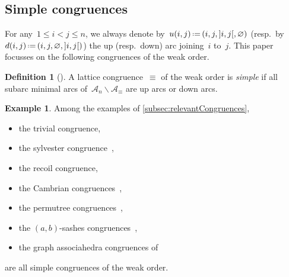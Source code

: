 \documentclass{amsart}
\theoremstyle{definition}
\newtheorem{definition}[theorem]{Definition}
\newtheorem{example}[theorem]{Example}
\newtheorem{remark}[theorem]{Remark}
\newcommand{\ssm}{\smallsetminus} %
\newcommand{\eqdef}{\mbox{\,\raisebox{0.2ex}{\scriptsize\ensuremath{\mathrm:}}\ensuremath{=}\,}} %
\newcommand{\darkblue}{\color{darkblue}} %
\newcommand{\defn}[1]{\textsl{\darkblue #1}} %
\newcommand{\arc}{\alpha} %
\newcommand{\arcs}{{\mathcal{A}}} %
\begin{document}

\subsection{Simple congruences}
\label{subsec:simpleCongruences}

For any~$1 \le i < j \le n$, we always denote by~$u(i,j) \eqdef (i, j, {]i,j[}, \varnothing)$ (resp.~by~$d(i,j) \eqdef (i, j, \varnothing, {]i,j[})$) the up (resp.~down) arc joining~$i$ to~$j$.
This paper focusses on the following congruences of the weak order.

\begin{definition}[{\cite[Sect.~4.4]{HoangMutze}}]
\label{def:simpleCongruence}
A lattice congruence~$\equiv$ of the weak order is \defn{simple} if all subarc minimal arcs of~$\arcs_n \ssm \arcs_\equiv$ are up arcs or down arcs.
\end{definition}


\begin{example}
Among the examples of \cref{subsec:relevantCongruences},
\begin{itemize}
\item the trivial congruence,
\item the sylvester congruence~\cite{Tonks, HivertNovelliThibon-algebraBinarySearchTrees},
\item the recoil congruence,
\item the Cambrian congruences~\cite{Reading-CambrianLattices, ChatelPilaud},
\item the permutree congruences~\cite{PilaudPons-permutrees},
\item the $(a,b)$-sashes congruences~\cite{Law,LaniniNovelli},
\item the graph associahedra congruences of~\cite{BarnardMcConville}
\end{itemize}
are all simple congruences of the weak order.
\end{example}
\end{document}
